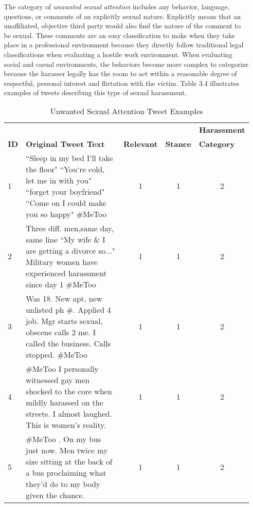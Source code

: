 The category of \textit{unwanted sexual attention} includes any behavior, language, questions, or comments of an explicitly sexual nature. Explicitly means that an unaffiliated, objective third party would also find the nature of the comment to be sexual. These comments are an easy classification to make when they take place in a professional environment because they directly follow traditional legal classifications when evaluating a hostile work environment. When evaluating social and casual environments, the behaviors become more complex to categorize because the harasser legally has the room to act within a reasonable degree of respectful, personal interest and flirtation with the victim. Table 3.4 illustrates examples of tweets describing this type of sexual harassment.

\begin{table}[H]
    \centering
    \caption{Unwanted Sexual Attention Tweet Examples}
    \begin{tabular}{m{1cm} m{8cm} m{1.5cm} m{1.1cm} m{2.1cm}}
        \toprule
        & {} & {} & {} & {\textbf{Harassment}} \\
        \rowcolor{White}\textbf{ID} & {\textbf{Original Tweet Text}} & {\textbf{Relevant}} & {\textbf{Stance}} & {\textbf{Category}} \\
                \midrule
        1 & ``Sleep in my bed I’ll take the floor" ``You`re cold, let me in with you" ``forget your boyfriend" ``Come on I could make you so happy" \#MeToo & \multicolumn{1}{c}{1} & \multicolumn{1}{c}{1} & \multicolumn{1}{c}{2}\\
        2 & Three diff. men,same day, same line ``My wife \& I are getting a divorce so..." Military women have experienced harassment since day 1 \#MeToo & \multicolumn{1}{c}{1} & \multicolumn{1}{c}{1} & \multicolumn{1}{c}{2}\\
        3 & Was 18. New apt, new unlisted ph \#. Applied 4 job. Mgr starts sexual, obscene calls 2 me. I called the business. Calls stopped. \#MeToo & \multicolumn{1}{c}{1} & \multicolumn{1}{c}{1} & \multicolumn{1}{c}{2}\\
        4 & \#MeToo I personally witnessed gay men shocked to the core when mildly harassed on the streets. I almost laughed. This is women's reality. & \multicolumn{1}{c}{1} & \multicolumn{1}{c}{1} & \multicolumn{1}{c}{2}\\
        5 & \#MeToo . On my bus just now. Men twice my size sitting at the back of a bus proclaiming what they’d do to my body given the chance. & \multicolumn{1}{c}{1} & \multicolumn{1}{c}{1} & \multicolumn{1}{c}{2}\\
        \bottomrule
    \end{tabular}
\end{table}

